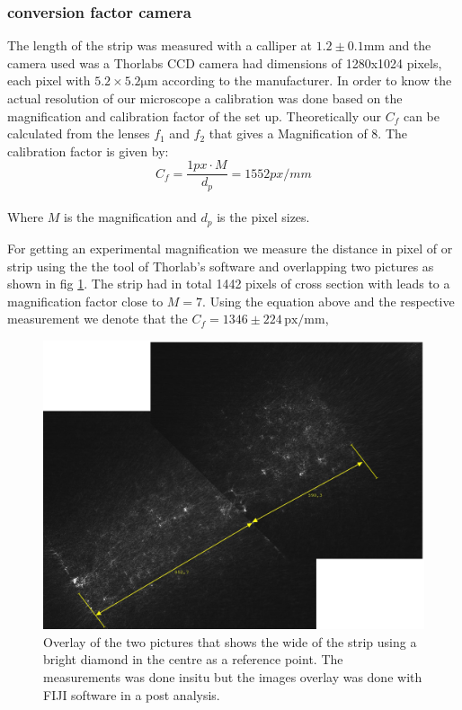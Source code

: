 \subsubsection{conversion factor camera}

The length of the strip was measured with a calliper at $1.2\pm 0.1\mathrm{mm}$ and the camera used was a Thorlabs CCD camera had dimensions of 1280x1024 pixels, each pixel with $5.2\times5.2 \mathrm{\mu m}$ according to the manufacturer.
In order to know the actual resolution of our microscope a calibration was done based on the magnification and calibration factor of the set up.
Theoretically our $C_{f}$ can be calculated from the lenses $f_{1}$ and $f_{2}$ that gives a Magnification of 8. The calibration factor is given by:
\\

\begin{equation}
C_{f}=\dfrac{1 px \cdot M}{d_{p}} = 1552 px/mm
\end{equation}\\

Where $M$ is the magnification and $d_{p}$ is the pixel sizes.

For getting an experimental magnification we measure the distance in pixel of or strip using the the tool of Thorlab’s software and overlapping two pictures as shown in fig \ref{fig:distance-sslip}. The strip had in total 1442 pixels of cross section  with leads to  a magnification factor close to $M=7$.
Using the equation above and the respective measurement we denote that the  $C_{f} =1346\pm224 \,\mathrm{px/mm}$,
 \begin{figure}
 	\centering
 	\includegraphics[width=0.7\linewidth]{"../figures/distance sslip"}
 	\caption{Overlay of the two pictures that shows the wide of the strip using a bright diamond in the centre as a reference point. The measurements was done insitu but the  images overlay was done with FIJI software in a post analysis.}
 	\label{fig:distance-sslip}
 \end{figure}
 

